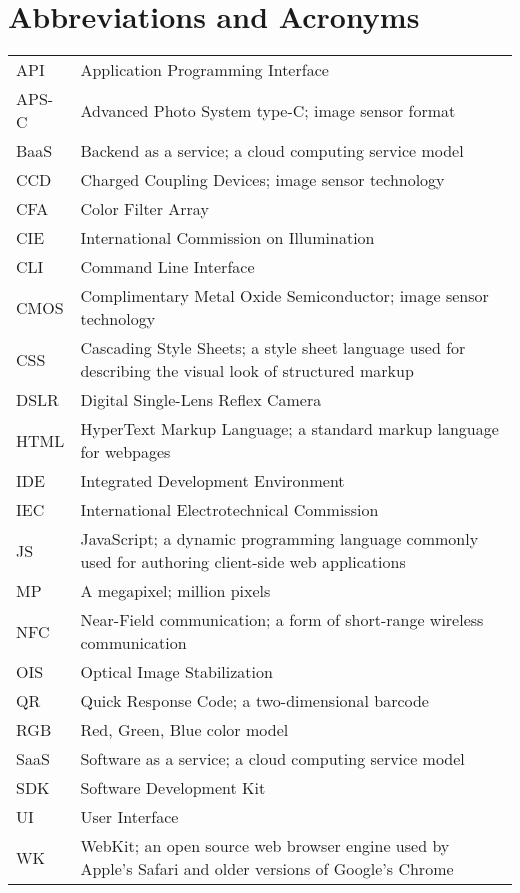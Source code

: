 \documentclass[thesis.tex]{subfiles}
\begin{document}
\chapter*{Abbreviations and Acronyms}

\noindent
\begin{longtable}{@{}p{}p{}@{}}
API & Application Programming Interface \\
APS-C & Advanced Photo System type-C; image sensor format \\
BaaS & Backend as a service; a cloud computing service model \\
CCD & Charged Coupling Devices; image sensor technology \\
CFA & Color Filter Array \\
CIE & International Commission on Illumination \\
CLI & Command Line Interface \\
CMOS & Complimentary Metal Oxide Semiconductor; image sensor technology \\
CSS & Cascading Style Sheets; a style sheet language used for describing the visual look of structured markup \\
DSLR & Digital Single-Lens Reflex Camera \\
HTML & HyperText Markup Language; a standard markup language for webpages \\
IDE & Integrated Development Environment \\
IEC & International Electrotechnical Commission \\
JS & JavaScript; a dynamic programming language commonly used for authoring client-side web applications \\
MP & A megapixel; million pixels \\
NFC & Near-Field communication; a form of short-range wireless communication \\
OIS & Optical Image Stabilization \\
QR & Quick Response Code; a two-dimensional barcode \\
RGB & Red, Green, Blue color model \\
SaaS & Software as a service; a cloud computing service model \\
SDK & Software Development Kit \\
UI & User Interface \\
WK & WebKit; an open source web browser engine used by Apple's Safari and older versions of Google's Chrome\\

\end{longtable}
\end{document}

